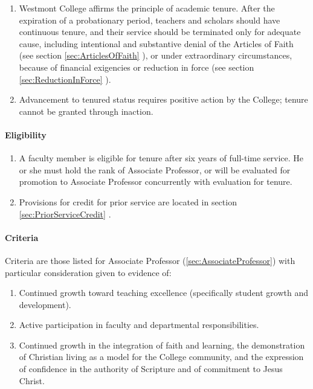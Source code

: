 			\begin{enumerate}
				\item{ Westmont College affirms the principle of academic tenure.  After the
					expiration of a probationary period, teachers and scholars should have
					continuous tenure, and their service should be terminated only for adequate
					cause, including intentional and substantive denial of the Articles of Faith
					(see
					section
					\ref{sec:ArticlesOfFaith}
					), or under extraordinary circumstances, because of
					financial exigencies or reduction in force (see
					section
					\ref{sec:ReductionInForce} ).}
				\item{ Advancement to tenured status requires positive action by the College;
					tenure cannot be granted through inaction.}
			\end{enumerate}
			\paragraph{Eligibility}
				\begin{enumerate}[label=\alph*)]
					\item{A faculty member is eligible for tenure after six years of full-time service.  He or she must hold the rank of Associate Professor, or will be evaluated for promotion to Associate Professor concurrently with evaluation for tenure.}
					\item{Provisions for credit for prior service are located in
						section
						\ref{sec:PriorServiceCredit}
						.}
				\end{enumerate}
			\paragraph{Criteria}
				Criteria are those listed for Associate Professor (\ref{sec:AssociateProfessor}) with particular consideration given to evidence of:
				\begin{enumerate}[label=\alph*)]
					\item{Continued growth toward teaching excellence (specifically student growth and development).}
					\item{Active participation in faculty and departmental responsibilities.}
					\item{Continued growth in the integration of faith and learning, the demonstration of Christian living as a model for the College community, and the expression of confidence in the authority of Scripture and of commitment to Jesus Christ.}
				\end{enumerate}
